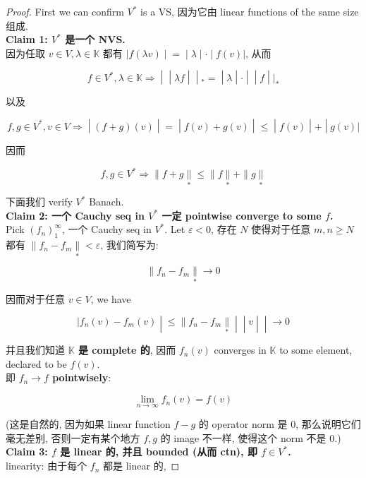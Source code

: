 \begin{proof}

First we can confirm \(V^{\ast}\) is a VS, 因为它由 linear functions of the same size 组成.\\
\textbf{Claim 1: \(V^{\ast}\) 是一个 NVS.}\\
因为任取 \(v \in V,\lambda \in \mathbb{K}\) 都有 \(\left. |f(\lambda v) \middle| = \middle| \lambda \middle| \cdot \middle| f(v)| \right.\), 从而

\[\left. f \in V^{\ast},\lambda \in \mathbb{K}\Longrightarrow \middle| \middle| \lambda f \middle| \middle| {}_{\ast} = \middle| \lambda \middle| \cdot \middle| \middle| f \middle| |_{\ast} \right.\]

以及

\[\left. f,g \in V^{\ast},v \in V\Longrightarrow \middle| (f + g)(v) \middle| = \middle| f(v) + g(v) \middle| \leq \middle| f(v) \middle| + \middle| g(v)| \right.\]

因而

\[f,g \in V^{\ast}\Longrightarrow \parallel f + g\underset{\ast}{\parallel} \leq \parallel f\underset{\ast}{\parallel} + \parallel g\underset{\ast}{\parallel}\]

下面我们 verify \(V^{\ast}\) Banach.\\
\textbf{Claim 2: 一个 Cauchy seq in \(V^{\ast}\) 一定 pointwise converge to some \(f\).}\\
Pick \((f_{n})_{1}^{\infty}\), 一个 Cauchy seq in \(V^{\ast}\). Let \(\varepsilon < 0\), 存在 \(N\) 使得对于任意 \(m,n \geq N\) 都有 \(\parallel f_{n} - f_{m}\underset{\ast}{\parallel} < \varepsilon\), 我们简写为:

\[\parallel f_{n} - f_{m}\underset{\ast}{\parallel}\rightarrow 0\]

因而对于任意 \(v \in V\), we have

\[\left. |f_{n}(v) - f_{m}(v) \middle| \leq \parallel f_{n} - f_{m}\underset{\ast}{\parallel} \middle| \middle| v \middle| \middle| \rightarrow 0 \right.\]

并且我们知道 \textbf{\(\mathbb{K}\) 是 complete 的}, 因而 \(f_{n}(v)\) converges in \(\mathbb{K}\) to some element, declared to be \(f(v)\).\\
即 \textbf{\(f_{n}\rightarrow f\) pointwisely}:

\[\lim\limits_{n\rightarrow\infty}f_{n}(v) = f(v)\]

(这是自然的, 因为如果 linear function \(f - g\) 的 operator norm 是 \(0\), 那么说明它们毫无差别, 否则一定有某个地方 \(f,g\) 的 image 不一样, 使得这个 norm 不是 \(0\).)\\
\textbf{Claim 3: \(f\) 是 linear 的, 并且 bounded (从而 ctn), 即 \(f \in V^{\ast}\).}\\
linearity: 由于每个 \(f_{n}\) 都是 linear 的,


\end{proof}
